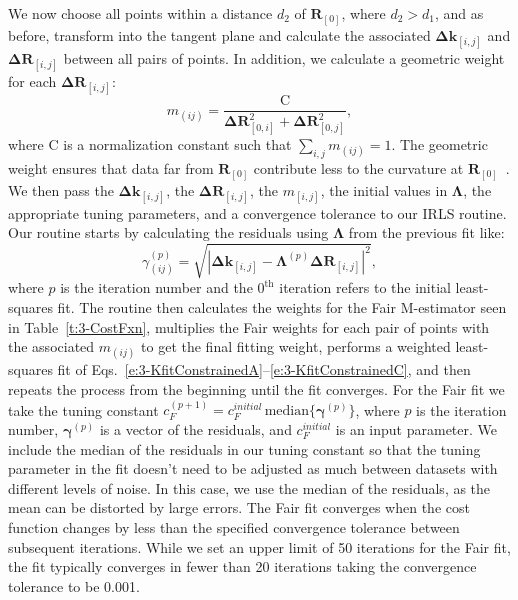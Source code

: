 We now choose all points within a distance $d_2$ of $\mathbf{R}_{[0]}$, where $d_2 > d_1$, and as before, transform into the tangent plane and calculate the associated $\mathbf{\Delta k}_{[i,j]}$ and $\mathbf{\Delta R}_{[i,j]}$ between all pairs of points.
In addition, we calculate a geometric weight for each $\mathbf{\Delta R}_{[i,j]}$:
\begin{equation}
  m_{(ij)} = \frac{\textrm{C}} {\mathbf{\Delta R}_{[0,i]}^2 + \mathbf{\Delta R}_{[0,j]}^2},
\end{equation}
where $\textrm{C}$ is a normalization constant such that $\sum\limits_{i,j} m_{(ij)} = 1$.
The geometric weight ensures that data far from $\mathbf{R}_{[0]}$ contribute less to the curvature at $\mathbf{R}_{[0]}$~\cite{RN32,RN31}.
We then pass the $\mathbf{\Delta k}_{[i,j]}$, the $\mathbf{\Delta R}_{[i,j]}$, the $m_{[i,j]}$, the initial values in $\bm{\Lambda}$, the appropriate tuning parameters, and a convergence tolerance to our IRLS routine.
Our routine starts by calculating the residuals using $\bm{\Lambda}$ from the previous fit like:
\begin{equation}
  \gamma_{(ij)}^{(p)} = \sqrt{|\mathbf{\Delta k}_{[i,j]}- \bm{\Lambda}^{(p)} \mathbf{\Delta R}_{[i,j]}|^2},
\end{equation}
where $p$ is the iteration number and the $0^{\textrm{th}}$ iteration refers to the initial least-squares fit.
The routine then calculates the weights for the Fair M-estimator seen in Table~\ref{t:3-CostFxn}, multiplies the Fair weights for each pair of points with the associated $m_{(ij)}$ to get the final fitting weight, performs a weighted least-squares fit of Eqs.~\ref{e:3-KfitConstrainedA}--\ref{e:3-KfitConstrainedC}, and then repeats the process from the beginning until the fit converges.
For the Fair fit we take the tuning constant $c_F^{(p+1)} = c_F^{initial} \, \textrm{median}\{ \bm{\gamma}^{(p)} \}$, where $p$ is the iteration number, $\bm{\gamma}^{(p)}$ is a vector of the residuals, and $c_F^{initial}$ is an input parameter.
We include the median of the residuals in our tuning constant so that the tuning parameter in the fit doesn't need to be adjusted as much between datasets with different levels of noise.
In this case, we use the median of the residuals, as the mean can be distorted by large errors.
The Fair fit converges when the cost function changes by less than the specified convergence tolerance between subsequent iterations.
While we set an upper limit of 50 iterations for the Fair fit, the fit typically converges in fewer than 20 iterations taking the convergence tolerance to be 0.001.

